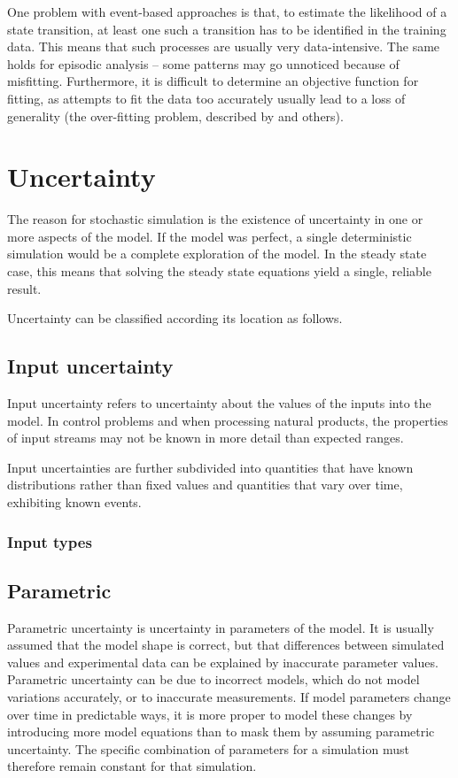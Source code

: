 One problem with event-based approaches is that, to estimate the likelihood of a state transition, at least one such a transition has to be identified in the training data.  
This means that such processes are usually very data-intensive.  
The same holds for episodic analysis -- some patterns may go unnoticed because of misfitting. 
Furthermore, it is difficult to determine an objective function for fitting, as attempts to fit the data too accurately usually lead to a loss of generality (the over-fitting problem, described by \citet{arora.khot2003fitting} and others).

\section{Uncertainty}
The reason for stochastic simulation is the existence of uncertainty in one or more aspects of the model.  
If the model was perfect, a single deterministic simulation would be a complete exploration of the model.  
In the steady state case, this means that solving the steady state equations yield a single, reliable result.  

Uncertainty can be classified according its location as follows.

\subsection{Input uncertainty}
Input uncertainty refers to uncertainty about the values of the inputs into the model.  
In control problems and when processing natural products, the properties of input streams may not be known in more detail than expected ranges.

Input uncertainties are further subdivided into quantities that have known distributions rather than fixed values and quantities that vary over time, exhibiting known events.

\subsubsection{Input types}

\subsection{Parametric}
Parametric uncertainty is uncertainty in parameters of the model.  
It is usually assumed that the model shape is correct, but that differences between simulated values and experimental data can be explained by inaccurate parameter values.  
Parametric uncertainty can be due to incorrect models, which do not model variations accurately, or to inaccurate measurements.  
If model parameters change over time in predictable ways, it is more proper to model these changes by introducing more model equations than to mask them by assuming parametric uncertainty.  
The specific combination of parameters for a simulation must therefore remain constant for that simulation.

